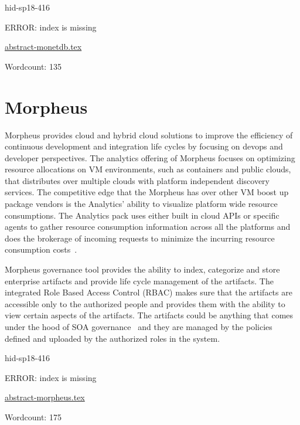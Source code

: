 \begin{IU}

hid-sp18-416

ERROR: index is missing

\href{https://github.com/cloudmesh-community/hid-sp18-416/blob/master//technology/abstract-monetdb.tex}{abstract-monetdb.tex}

 

Wordcount: 135

\end{IU}

\section{Morpheus}

Morpheus provides cloud and hybrid cloud solutions to improve the
efficiency of continuous development and integration life cycles by
focusing on devops and developer perspectives. The analytics offering
of Morpheus focuses on optimizing resource allocations on VM
environments, such as containers and public clouds, that distributes
over multiple clouds with platform independent discovery services. The
competitive edge that the Morpheus has over other VM boost up package
vendors is the Analytics’ ability to visualize platform wide resource
consumptions. The Analytics pack uses either built in cloud APIs or
specific agents to gather resource consumption information across all
the platforms and does the brokerage of incoming requests to minimize
the incurring resource consumption
costs~\cite{hid-sp18-416-www-morpheus-product-guide}.

Morpheus governance tool provides the ability to index, categorize and
store enterprise artifacts and provide life cycle management of the
artifacts. The integrated Role Based Access Control (RBAC) makes sure
that the artifacts are accessible only to the authorized people and
provides them with the ability to view certain aspects of the
artifacts. The artifacts could be anything that comes under the hood
of SOA governance~\cite{hid-sp18-416-www-soa-governance-wikipedia} and
they are managed by the policies defined and uploaded by the
authorized roles in the system.


\begin{IU}

hid-sp18-416

ERROR: index is missing

\href{https://github.com/cloudmesh-community/hid-sp18-416/blob/master//technology/abstract-morpheus.tex}{abstract-morpheus.tex}

 

Wordcount: 175

\end{IU}

